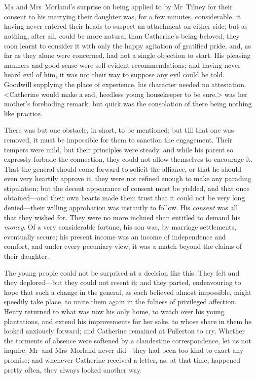 \chapter[Chapter \thechapter]{} 

 \lettrine{M}{r} and Mrs~Morland's surprise on being applied to by Mr~Tilney for their consent to his marrying their daughter was, for a few minutes, considerable, it having never entered their heads to suspect an attachment on either side; but as nothing, after all, could be more natural than Catherine's being beloved, they soon learnt to consider it with only the happy agitation of gratified pride, and, as far as they alone were concerned, had not a single objection to start. His pleasing manners and good sense were self-evident recommendations; and having never heard evil of him, it was not their way to suppose any evil could be told. Goodwill supplying the place of experience, his character needed no attestation. <Catherine would make a sad, heedless young housekeeper to be sure,> was her mother's foreboding remark; but quick was the consolation of there being nothing like practice. 

 There was but one obstacle, in short, to be mentioned; but till that one was removed, it must be impossible for them to sanction the engagement. Their tempers were mild, but their principles were steady, and while his parent so expressly forbade the connection, they could not allow themselves to encourage it. That the general should come forward to solicit the alliance, or that he should even very heartily approve it, they were not refined enough to make any parading stipulation; but the decent appearance of consent must be yielded, and that once obtained—and their own hearts made them trust that it could not be very long denied—their willing approbation was instantly to follow. His \textit{consent} was all that they wished for. They were no more inclined than entitled to demand his \textit{money}. Of a very considerable fortune, his son was, by marriage settlements, eventually secure; his present income was an income of independence and comfort, and under every pecuniary view, it was a match beyond the claims of their daughter. 

 The young people could not be surprised at a decision like this. They felt and they deplored—but they could not resent it; and they parted, endeavouring to hope that such a change in the general, as each believed almost impossible, might speedily take place, to unite them again in the fulness of privileged affection. Henry returned to what was now his only home, to watch over his young plantations, and extend his improvements for her sake, to whose share in them he looked anxiously forward; and Catherine remained at Fullerton to cry. Whether the torments of absence were softened by a clandestine correspondence, let us not inquire. Mr~and Mrs~Morland never did—they had been too kind to exact any promise; and whenever Catherine received a letter, as, at that time, happened pretty often, they always looked another way. 

